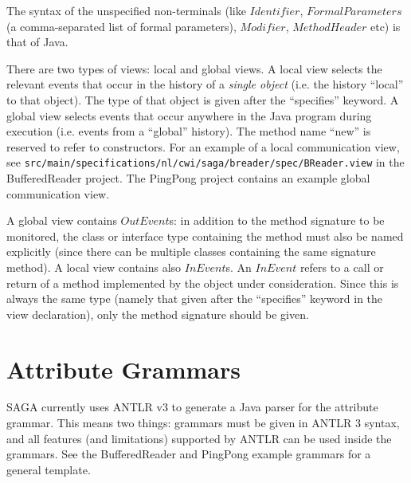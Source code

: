 \documentclass{article}
\begin{document}
The syntax of the unspecified non-terminals (like $Identifier$, $FormalParameters$ (a comma-separated list of formal parameters), $Modifier$, $MethodHeader$ etc) is that of Java.

There are two types of views: local and global views.  A local view selects the relevant events that occur in the history of a \emph{single object} (i.e. the history ``local'' to that object).  The type of that object is given after the ``specifies'' keyword.  A global view selects events that occur anywhere in the Java program during execution (i.e. events from a ``global'' history).  The method name ``new'' is reserved to refer to constructors. For an example of a local communication view,  see \lstinline+src/main/specifications/nl/cwi/saga/breader/spec/BReader.view+ in the BufferedReader project.  The PingPong project contains an example global communication view.

A global view contains $OutEvent$s: in addition to the method signature to be monitored, the class or interface type containing the method must also be named explicitly (since there can be multiple classes containing the same signature method).  A local view contains also $InEvent$s.  An $InEvent$ refers to a call or return of a method implemented by the object under consideration.  Since this is always the same type (namely that given after the ``specifies'' keyword in the view declaration), only the method signature should be given.


\section{Attribute Grammars}
\label{sec:grammars}
SAGA currently uses ANTLR v3 \cite{antlr.07} to generate a Java parser for the attribute grammar.  This means two things: grammars must be given in ANTLR 3 syntax,  and all features (and limitations) supported by ANTLR can be used inside the grammars.  See the BufferedReader and PingPong example grammars for a general template.
\end{document}
